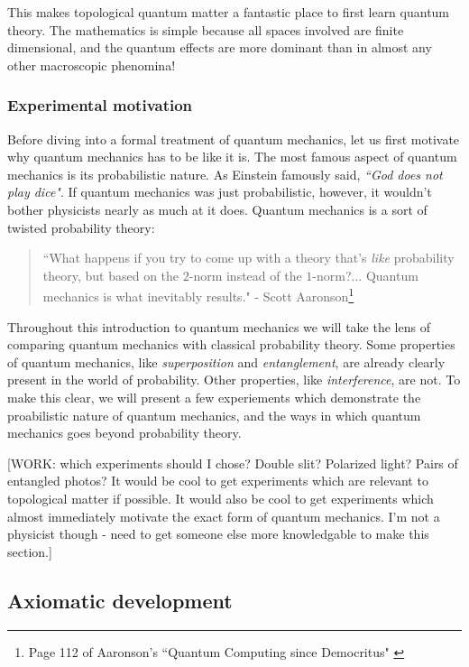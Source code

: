 \documentclass{article}
\theoremstyle{definition}
\numberwithin{figure}{section}
\begin{document}
This makes topological quantum matter a fantastic place to first learn quantum theory. The mathematics is simple because all spaces involved are finite dimensional, and the quantum effects are more dominant than in almost any other macroscopic phenomina!

\subsubsection{Experimental motivation}

Before diving into a formal treatment of quantum mechanics, let us first motivate why quantum mechanics has to be like it is. The most famous aspect of quantum mechanics is its probabilistic nature. As Einstein famously said, \textit{``God does not play dice"}. If quantum mechanics was just probabilistic, however, it wouldn't bother physicists nearly as much at it does. Quantum mechanics is a sort of twisted probability theory:

\begin{quote}
``What happens if you try to come up with a theory that's \textit{like} probability theory, but based on the $2$-norm instead of the $1$-norm?... Quantum mechanics is what inevitably results." - Scott Aaronson\footnote{Page 112 of Aaronson's ``Quantum Computing since Democritus" \cite{aaronson2013quantum}}
\end{quote}

Throughout this introduction to quantum mechanics we will take the lens of comparing quantum mechanics with classical probability theory. Some properties of quantum mechanics, like \textit{superposition} and \textit{entanglement}, are already clearly present in the world of probability. Other properties, like \textit{interference}, are not. To make this clear, we will present a few experiements which demonstrate the proabilistic nature of quantum mechanics, and the ways in which quantum mechanics goes beyond probability theory.

[WORK: which experiments should I chose? Double slit? Polarized light? Pairs of entangled photos? It would be cool to get experiments which are relevant to topological matter if possible. It would also be cool to get experiments which almost immediately motivate the exact form of quantum mechanics. I'm not a physicist though - need to get someone else more knowledgable to make this section.]

\subsection{Axiomatic development}
\end{document}
